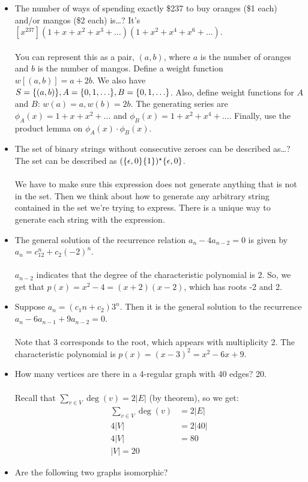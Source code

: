 \documentclass[]{article}
\theoremstyle{definition}
\newcommand{\lecture}[1]{\marginpar{{\footnotesize $\leftarrow$ \underline{#1}}}}
\DeclarePairedDelimiter{\set}{\lbrace}{\rbrace}
\begin{document}
\begin{itemize}
			\item The number of ways of spending exactly \$237 to buy oranges (\$1 each) and/or mangos (\$2 each) is\dots? It's $[x^{237}](1 + x + x^2 + x^3 + \ldots)(1 + x^2 + x^4 + x^6 + \ldots)$.
				\\ \\
				You can represent this as a pair, $(a, b)$, where $a$ is the number of oranges and $b$ is the number of mangos. Define a weight function $w[(a, b)] = a + 2b$. We also have $S = \set{(a, b) }, A = \set{0, 1, \ldots }, B = \set{0, 1, \ldots }$. Also, define weight functions for $A$ and $B$: $w(a) = a, w(b) = 2b$. The generating series are $\phi_A(x) = 1 + x + x^2 + \ldots$ and $\phi_B(x) = 1 + x^2 + x^4 + \ldots$. Finally, use the product lemma on $\phi_A(x) \cdot \phi_B(x)$.

			\item The set of binary strings without consecutive zeroes can be described as\dots? The set can be described as $(\set{\epsilon, 0}\set{1 })^\star \set{\epsilon, 0 }$.
				\\ \\
				We have to make sure this expression does not generate anything that is not in the set. Then we think about how to generate any arbitrary string contained in the set we're trying to express. There is a unique way to generate each string with the expression.
			\item \lecture{February 27, 2013} The general solution of the recurrence relation $a_n - 4a_{n - 2} = 0$ is given by $a_n = c_12^n + c_2(-2)^n$.
				\\ \\
				$a_{n - 2}$ indicates that the degree of the characteristic polynomial is 2. So, we get that $p(x) = x^2 - 4 = (x + 2)(x - 2)$, which has roots -2 and 2.
			\item Suppose $a_n = (c_1n + c_2)3^n$. Then it is the general solution to the recurrence $a_n - 6a_{n-1} + 9a_{n-2} = 0$.
				\\ \\
				Note that 3 corresponds to the root, which appears with multiplicity 2. The characteristic polynomial is $p(x) = (x-3)^2 = x^2 - 6x + 9$.
			\item How many vertices are there in a 4-regular graph with 40 edges? 20.
				\\ \\
				Recall that $\sum_{v \in V} \deg(v) = 2|E|$ (by theorem), so we get:
				\begin{align*}
					\sum_{v \in V} \deg(v) &= 2|E| \\
					4|V| &= 2|40| \\
					4|V| &= 80 \\
					|V| = 20
				\end{align*}
			\item Are the following two graphs isomorphic?
				\begin{center}
\end{center}
\end{itemize}
\end{document}
